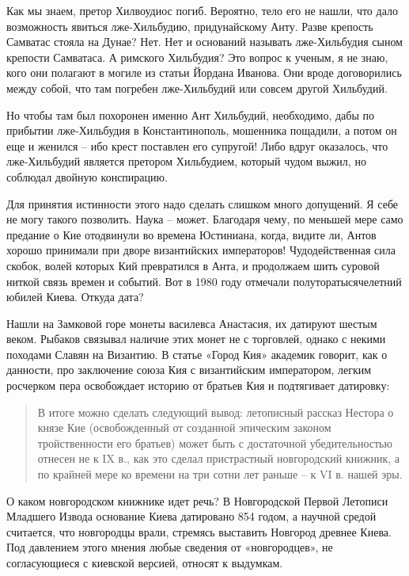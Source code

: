 Как мы знаем, претор Хилвоудиос погиб. Вероятно, тело его не нашли, что дало возможность явиться лже-Хильбудию, придунайскому Анту. Разве крепость Самватас стояла на Дунае? Нет. Нет и оснований называть лже-Хильбудия сыном крепости Самватаса. А римского Хильбудия? Это вопрос к ученым, я не знаю, кого они полагают в могиле из статьи Йордана Иванова. Они вроде договорились между собой, что там погребен лже-Хильбудий или совсем другой Хильбудий.

Но чтобы там был похоронен именно Ант Хильбудий, необходимо, дабы по прибытии лже-Хильбудия в Константинополь, мошенника пощадили, а потом он еще и женился – ибо крест поставлен его супругой! Либо вдруг оказалось, что лже-Хильбудий является претором Хильбудием, который чудом выжил, но соблюдал двойную конспирацию. 

Для принятия истинности этого надо сделать слишком много допущений. Я себе не могу такого позволить. Наука – может. Благодаря чему, по меньшей мере само предание о Кие отодвинули во времена Юстиниана, когда, видите ли, Антов хорошо принимали при дворе византийских императоров! Чудодейственная сила скобок, волей которых Кий превратился в Анта, и продолжаем шить суровой ниткой связь времен и событий. Вот в 1980 году отмечали полуторатысячелетний юбилей Киева. Откуда дата? 

Нашли на Замковой горе монеты василевса Анастасия, их датируют шестым веком. Рыбаков связывал наличие этих монет не с торговлей, однако с некими походами Славян на Византию. В статье «Город Кия» академик говорит, как о данности, про заключение союза Кия с византийским императором, легким росчерком пера освобождает историю от братьев Кия и подтягивает датировку: 

\begin{quotation}
В итоге можно сделать следующий вывод: летописный рассказ Нестора о князе Кие (освобожденный от созданной эпическим законом тройственности его братьев) может быть с достаточной убедительностью отнесен не к IX в., как это сделал пристрастный новгородский книжник, а по крайней мере ко времени на три сотни лет раньше – к VI в. нашей эры.
\end{quotation}

О каком новгородском книжнике идет речь? В Новгородской Первой Летописи Младшего Извода основание Киева датировано 854 годом, а научной средой считается, что новгородцы врали, стремясь выставить Новгород древнее Киева. Под давлением этого мнения любые сведения от «новгородцев», не согласующиеся с киевской версией, относят к выдумкам.

